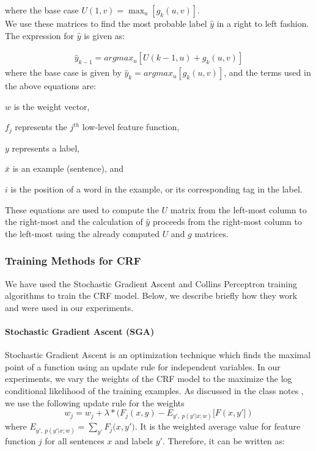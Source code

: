 \documentclass[11pt,a4paper,oneside]{article}
\begin{document}
where the base case $U(1,v) = \max_{u}[g_k(u, v)]$.\\

We use these matrices to find the most probable label $\hat{y}$ in a right to left fashion. The expression for $\hat{y}$ is given as:

\begin{align}
\hat{y}_{k-1} = argmax_{u}[U(k - 1, u) + g_k(u, v)]
\end{align}
where the base case is given by $\hat{y}_k = argmax_{u}[g_k(u, v)]$, and the terms used in the above equations are:

\begin{description}
\item{$w$} is the weight vector,
\item{$f_j$} represents the $j^{th}$ low-level feature function,
\item{$y$} represents a label,
\item{$\bar{x}$} is an example (sentence), and
\item{$i$} is the position of a word in the example, or its corresponding tag in the label.
\end{description}

These equations are used to compute the $U$ matrix from the left-most column to the right-most and the calculation of $\hat{y}$ proceeds from the right-most column to the left-most using the already computed $U$ and $g$ matrices.

\subsubsection{Training Methods for CRF}

We have used the Stochastic Gradient Ascent and Collins Perceptron training algorithms to train the CRF model. Below, we describe briefly how they work and were used in our experiments.

\paragraph*{Stochastic Gradient Ascent (SGA)}
Stochastic Gradient Ascent is an optimization technique which finds the maximal point of a function using an update rule for independent variables. In our experiments, we vary the weights of the CRF model to the maximize the log conditional likelihood of the training examples. As discussed in the class notes \cite{classNotes}, we use the following update rule for the weights
\begin{equation}
w_j = w_j + \lambda * (F_j(x, y) - E_{y',~p(y'|x;w)}[F(x,y'])
\end{equation}
where
$E_{y',~p(y'|x;w)} = \sum_{y'}{F_j(x, y'})$. It is the weighted average value for feature function $j$ for all sentences $x$ and labels $y'$. Therefore, it can be written as:
\end{document}
